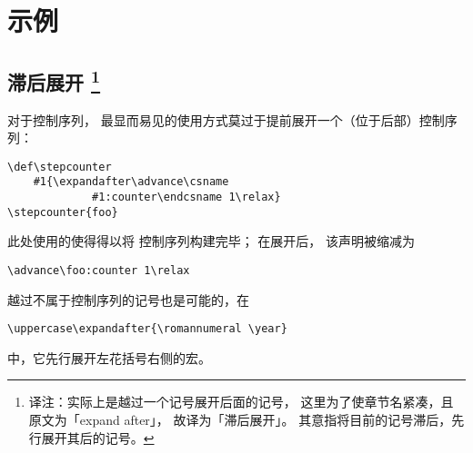 \documentclass{book}
\begin{document}
\section{示例}

\subsection{滞后展开
\footnote{译注：实际上是越过一个记号展开后面的记号，
这里为了使章节名紧凑，且原文为「expand after」，
故译为「滞后展开」。
其意指将目前的记号滞后，先行展开其后的记号。}}

对于控制序列，
最显而易见的使用方式莫过于提前展开一个（位于后部）控制序列：
\begin{verbatim}
\def\stepcounter
    #1{\expandafter\advance\csname 
             #1:counter\endcsname 1\relax}
\stepcounter{foo}
\end{verbatim}
此处使用的使得得以将
控制序列构建完毕；
在展开后，
该声明被缩减为
\begin{verbatim}
\advance\foo:counter 1\relax
\end{verbatim}
越过不属于控制序列的记号也是可能的，在
\begin{verbatim}
\uppercase\expandafter{\romannumeral \year}
\end{verbatim}
中，它先行展开左花括号右侧的宏。
\end{document}
